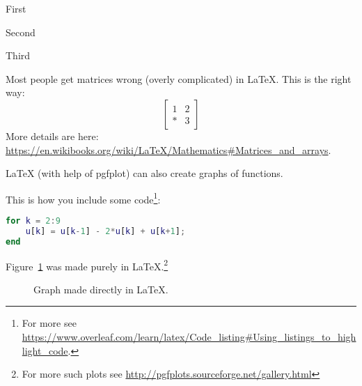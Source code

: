 \documentclass{amsart}
\begin{document}
\begin{compactenum}
\item First
\item Second
\item Third
\end{compactenum}

Most people get matrices wrong (overly complicated) in \LaTeX. This is the right way:
\[ %
  \begin{bmatrix}
    1 & 2 \\
    \ast & 3
  \end{bmatrix}
\]
More details are here:
\url{https://en.wikibooks.org/wiki/LaTeX/Mathematics\#Matrices_and_arrays}.


LaTeX (with help of pgfplot) can also create graphs of functions.
\begin{figure}[htb]\centering
 \end{figure}

 This is how you include some code\footnote{For more see \url{https://www.overleaf.com/learn/latex/Code_listing\#Using_listings_to_highlight_code}.}:
\begin{lstlisting}[language=Matlab]
for k = 2:9
    u[k] = u[k-1] - 2*u[k] + u[k+1];
end
\end{lstlisting}

Figure~\ref{fig:csvfig} was made purely in \LaTeX.\footnote{For more such plots see \url{http://pgfplots.sourceforge.net/gallery.html}}

\begin{figure}[htb]
  \centering
\caption{Graph made directly in LaTeX.}\label{fig:csvfig}
\end{figure}
\end{document}
